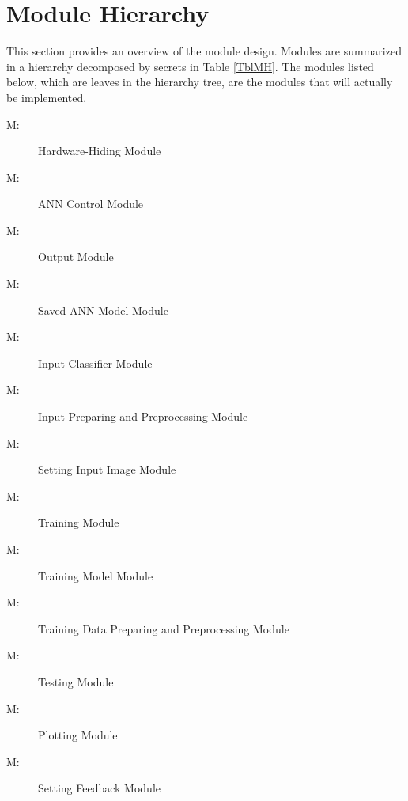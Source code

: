\documentclass[12pt, titlepage]{article}
\newcounter{mnum}
\newcommand{\mthemnum}{M\themnum}
\begin{document}
\section{Module Hierarchy} \label{SecMH}

This section provides an overview of the module design. Modules are summarized
in a hierarchy decomposed by secrets in Table \ref{TblMH}. The modules listed
below, which are leaves in the hierarchy tree, are the modules that will
actually be implemented.

\begin{description}
\item [ \mthemnum \label{HW}:] Hardware-Hiding Module
\item [ \mthemnum \label{ACM}:] ANN Control Module
\item [ \mthemnum \label{Output}:] Output Module
\item [ \mthemnum \label{SavedANN}:] Saved ANN Model Module
\item [ \mthemnum \label{In-class}:] Input Classifier Module
\item [ \mthemnum \label{In-prep}:] Input Preparing and Preprocessing Module
\item [ \mthemnum \label{In-set}:] Setting Input Image Module
\item [ \mthemnum \label{Train}:] Training Module
\item [ \mthemnum \label{Train-Model}:] Training Model Module
\item [ \mthemnum \label{Train-Data}:] Training Data Preparing and Preprocessing Module
\item [ \mthemnum \label{Test}:] Testing Module
\item [ \mthemnum \label{Plot}:] Plotting Module
\item [ \mthemnum \label{Feedback}:] Setting Feedback Module
\end{description}
\end{document}
